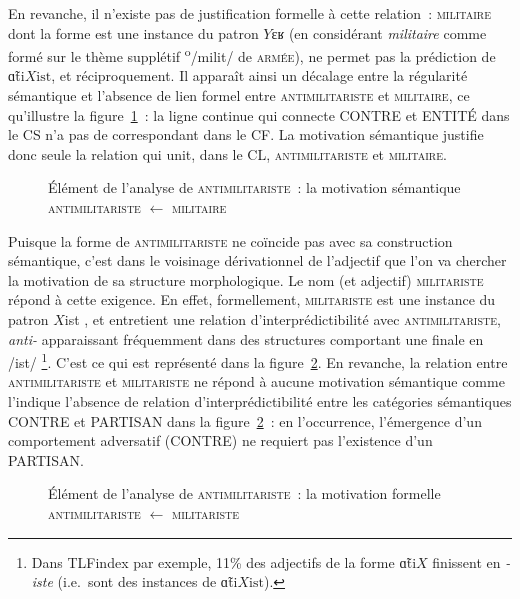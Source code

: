 \documentclass[output=paper]{langsci/langscibook}
\begin{document}
En revanche, il n'existe pas de justification formelle à cette relation~: \textsc{militaire} dont la forme est une instance du patron $Y\textrm{ɛʁ}$ 
 (en considérant \emph{militaire} comme formé sur le thème supplétif \textsuperscript{o}/milit/
  de \textsc{armée}), ne permet pas la prédiction de~$\textrm{ɑ̃ti}X\textrm{ist}$, et réciproquement. Il apparaît ainsi un décalage entre la régularité sémantique et l'absence de lien formel entre \textsc{antimilitariste} et \textsc{militaire}, ce qu'illustre la figure~\ref{fig:antimilitariste1}~: la ligne continue qui connecte {CONTRE} et {ENTITÉ} dans le CS n'a pas de correspondant dans le CF. La motivation sémantique justifie donc seule la relation qui unit, dans le CL, \textsc{antimilitariste} et \textsc{militaire}.
%
\begin{figure}
  \centering
  \caption{Élément de l'analyse de \textsc{antimilitariste}~: la motivation sémantique \textsc{antimilitariste} $\leftarrow$  \textsc{militaire}}
  \label{fig:antimilitariste1}
\end{figure}

Puisque la forme de \textsc{antimilitariste} ne coïncide pas avec sa construction sémantique, c'est dans le voisinage dérivationnel de l'adjectif que l'on va chercher la motivation de sa structure morphologique. Le nom (et adjectif) \textsc{militariste} répond à cette exigence.  En effet, formellement, \textsc{militariste} est une instance du patron $X$ist%
, et entretient une relation d'interprédictibilité avec \textsc{antimilitariste}, \emph{\mbox{anti-}} apparaissant fréquemment dans des structures comportant une finale en /ist/%
\footnote{%
  Dans TLFindex par exemple, 11\% des adjectifs de la forme $\textrm{ɑ̃ti}X$ finissent en \emph{\mbox{-iste}} (i.e.\ sont des instances de $\textrm{ɑ̃ti}X\textrm{ist}$).%
}.  C'est ce qui est représenté dans la figure~\ref{fig:antimilitariste2}.   En revanche, la relation entre \textsc{antimilitariste} et \textsc{militariste} ne répond à aucune motivation sémantique comme l'indique l'absence  de relation d'interprédictibilité entre les catégories sémantiques {CONTRE} et {PARTISAN} dans la figure~\ref{fig:antimilitariste2}~: en l'occurrence, l'émergence d'un comportement adversatif ({CONTRE}) ne requiert pas l'existence d'un {PARTISAN}.
%
\begin{figure}
  \centering
  \caption{Élément de l'analyse de \textsc{antimilitariste}~:  la motivation formelle \textsc{antimilitariste} $\leftarrow$  \textsc{militariste}}
  \label{fig:antimilitariste2}
\end{figure}
\end{document}
